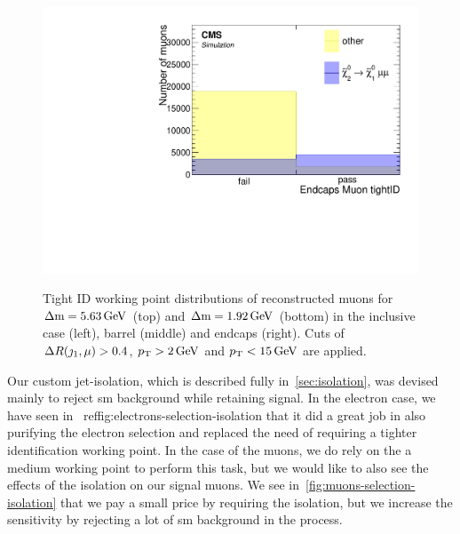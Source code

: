 \begin{figure}[!htb]
\includegraphics[width=0.32\linewidth]{plots/lepton_selection/lepton_selection_dm1p92/none_Muons_endcape_tight.pdf} \\
\caption[tight ID working point distribution of reconstructed muons]{Tight ID working point distributions of reconstructed muons for $\Delta\mathrm{m}=5.63\,\text{Ge\hspace{-.08em}V}$ (top) and $\Delta\mathrm{m}=1.92\,\text{Ge\hspace{-.08em}V}$ (bottom) in the inclusive \pt case (left), barrel (middle) and endcaps (right). Cuts of $\Delta R(\jmath_1,\mu)>0.4$, $p_{\mathrm{T}}>2\,\text{Ge\hspace{-.08em}V}$ and $p_{\mathrm{T}}<15\,\text{Ge\hspace{-.08em}V}$ are applied.}
\label{fig:muons-selection-id-tight}
\end{figure}

Our custom jet-isolation, which is described fully in~\ref{sec:isolation}, was devised mainly to reject \gls{sm} background while retaining signal. In the electron case, we have seen in ~ref{fig:electrons-selection-isolation} that it did a great job in also purifying the electron selection and replaced the need of requiring a tighter identification working point. In the case of the muons, we do rely on the a medium working point to perform this task, but we would like to also see the effects of the isolation on our signal muons. We see in~\ref{fig:muons-selection-isolation} that we pay a small price by requiring the isolation, but we increase the sensitivity by rejecting a lot of \gls{sm} background in the process.

